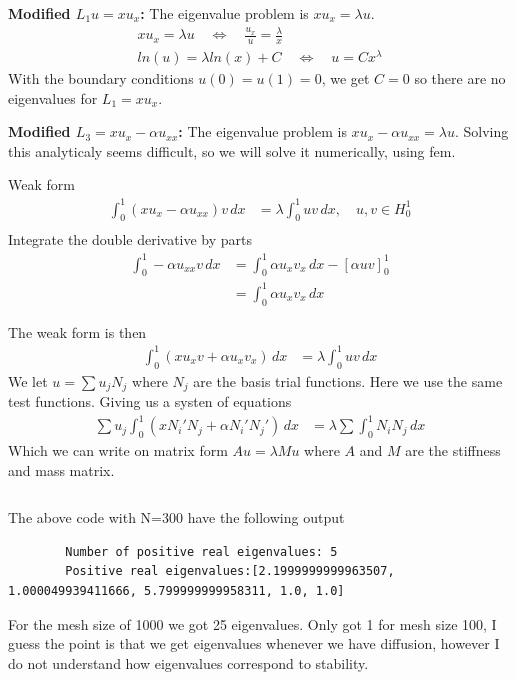 \documentclass[a4paper,12pt]{article}
\theoremstyle{exerciseStyle}
\theoremstyle{solutionStyle}
\begin{document}
\begin{solution}{5.6}
    \medskip\noindent\textbf{Modified $L_1 u = x u_x$:}
    The eigenvalue problem is $x u_x = \lambda u$.
    \begin{gather*}
        x u_x = \lambda u \quad \Longleftrightarrow \quad \frac{u_x}{u} = \frac{\lambda}{x} \\
        ln(u) = \lambda ln(x) + C \quad \Longleftrightarrow \quad u = C x^{\lambda}
    \end{gather*}%
    With the boundary conditions $u(0) = u(1) = 0$, we get $C = 0$ so there are no eigenvalues for $L_1 = x u_x$.

    \medskip\noindent\textbf{Modified $L_3 = x u_x - \alpha u_{xx} $:}
    The eigenvalue problem is $x u_x - \alpha u_{xx} = \lambda u$.
    Solving this analyticaly seems difficult, so we will solve it numerically, using fem.

    Weak form
    \begin{align*}
        \int_0^1 (x u_x - \alpha u_{xx}) v \, dx & = \lambda \int_0^1 u v \, dx, \quad u, v \in H_0^1 \\
    \end{align*}%
    Integrate the double derivative by parts
    \begin{align*}
        \int_0^1  - \alpha u_{xx} v \, dx & =   \int_0^1 \alpha u_x v_x \, dx - [ \alpha u v ]_0^1 \\
                                          & = \int_0^1 \alpha u_x v_x \, dx
    \end{align*}

    The weak form is then
    \begin{align*}
        \int_0^1 (x u_x v + \alpha u_x v_x) \, dx & = \lambda \int_0^1 u v \, dx
    \end{align*}%
    We let $ u = \sum u_j N_j$ where $N_j$ are the basis trial functions. Here we use the same test functions.
    Giving us a systen of equations
    \begin{align*}
        \sum u_j \int_0^1 (x N_i' N_j + \alpha N_i' N_j') \, dx & = \lambda \sum \int_0^1 N_i N_j \, dx
    \end{align*}%
    Which we can write on matrix form $A u = \lambda M u$ where $A$ and $M$ are the stiffness and mass matrix.

    \inputminted[linenos, breaklines, frame=lines]{python}{ex56.py}
    The above code with N=300 have the following output
    \begin{verbatim}
        Number of positive real eigenvalues: 5
        Positive real eigenvalues:[2.1999999999963507, 1.000049939411666, 5.799999999958311, 1.0, 1.0]
    \end{verbatim}


    For the mesh size of 1000 we got 25 eigenvalues. Only got 1 for mesh size 100, I guess the point is that we get eigenvalues
    whenever we have diffusion, however I do not understand how eigenvalues correspond to stability.


\end{solution}
\end{document}
